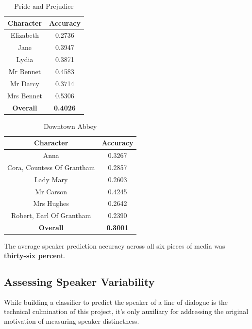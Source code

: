 \documentclass{article}
\begin{document}
\begin{titlepage}
\begin{table}[H]
    \centering
    \begin{tabular}{|c|c|}
        \hline
        \textbf{Character} & \textbf{Accuracy} \\
        \hline
        Elizabeth & 0.2736 \\
        \hline
        Jane & 0.3947 \\
        \hline
        Lydia & 0.3871 \\
        \hline
        Mr Bennet & 0.4583 \\
        \hline
        Mr Darcy & 0.3714 \\
        \hline
        Mrs Bennet & 0.5306 \\
        \hline
        \textbf{Overall} & \textbf{0.4026} \\
        \hline
    \end{tabular}
    \caption{Pride and Prejudice}
    \label{tab:pride_and_prejudice_accuracy}
\end{table}

\begin{table}[H]
    \centering
    \begin{tabular}{|c|c|}
        \hline
        \textbf{Character} & \textbf{Accuracy} \\
        \hline
        Anna & 0.3267 \\
        \hline
        Cora, Countess Of Grantham & 0.2857 \\
        \hline
        Lady Mary & 0.2603 \\
        \hline
        Mr Carson & 0.4245 \\
        \hline
        Mrs Hughes & 0.2642 \\
        \hline
        Robert, Earl Of Grantham & 0.2390 \\
        \hline
        \textbf{Overall} & \textbf{0.3001} \\
        \hline
    \end{tabular}
    \caption{Downtown Abbey}
    \label{tab:downtown_abbey_accuracy}
\end{table}

The average speaker prediction accuracy across all six pieces of media was \textbf{thirty-six percent}.

\subsection{Assessing Speaker Variability}
While building a classifier to predict the speaker of a line of dialogue is the technical culmination of this project, it's only auxiliary for addressing the original motivation of measuring speaker distinctness.


\end{titlepage}
\end{document}
